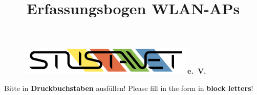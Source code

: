 \documentclass[a4paper,10pt]{scrartcl}
\title{Erfassungsbogen WLAN-APs}
\date{}
\begin{document}

\maketitle
\vspace{-60pt}

\begin{figure}[t!]
   \centering
   \vspace{-40pt}
   \mbox{\includegraphics[width=0.75\textwidth,keepaspectratio]{Bilder/StuStaNet_Logo}\Huge \sffamily \textbf{e.\ V.}}
   \vspace{-40pt}
\end{figure}








	\Large Bitte in \textbf{Druckbuchstaben} ausfüllen! Please fill in the form in \textbf{block letters}!\\


\vfill
\end{document}
